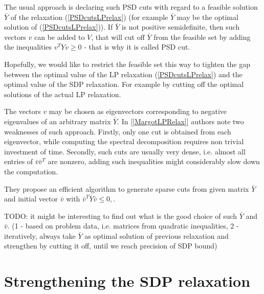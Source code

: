 \documentclass[12pt]{book}
\theoremstyle{definition}
\begin{document}
The usual approach is declaring such PSD cuts with regard to a feasible solution $\bar{Y}$ of the relaxation (\ref{PSDcutsLPrelax}) (for example $\bar{Y}$ may be the optimal solution of (\ref{PSDcutsLPrelax})). If $\bar{Y}$ is not positive semidefinite, then such vectors $v$ can be added to $V$, that will cut off $\bar{Y}$ from the feasible set by adding the inequalities $v^TYv\geq 0$ - that is why it is called PSD cut. 

Hopefully, we would like to restrict the feasible set this way to tighten the gap between the optimal value of the LP relaxation (\ref{PSDcutsLPrelax}) and the optimal value of the SDP relaxation. For example by cutting off the optimal solutions of the actual LP relaxation.


The vectors $v$ may be chosen as eigenvectors corresponding to negative eigenvalues of an arbitrary matrix $\bar{Y}$.
In [\ref{MargotLPRelax}] authors note two weaknesses of such approach. Firstly, only one cut is
obtained from each eigenvector, while computing the spectral decomposition requires non trivial investment of time. Secondly,
such cuts are usually very dense, i.e. almost all entries of $\bar{v}\bar{v}^T$ are nonzero, adding such inequalities might considerably slow down the computation. 

They propose an efficient algorithm to generate sparse cuts from given matrix $\bar{Y}$ and initial vector $\bar{v}$ with $\bar{v}^{T}\bar{Y}\bar{v} \leq 0,$.

TODO: it might be interesting to find out what is the good choice of such $\bar{Y}$ and $\bar{v}$. 
(1 - based on problem data, i.e. matrices from quadratic inequalities, 
2 - iteratively, always take $\bar{Y}$ as optimal solution of previous relaxation and strengthen by cutting it off, until we reach precision of SDP bound)


\section{Strengthening the SDP relaxation}
\end{document}
